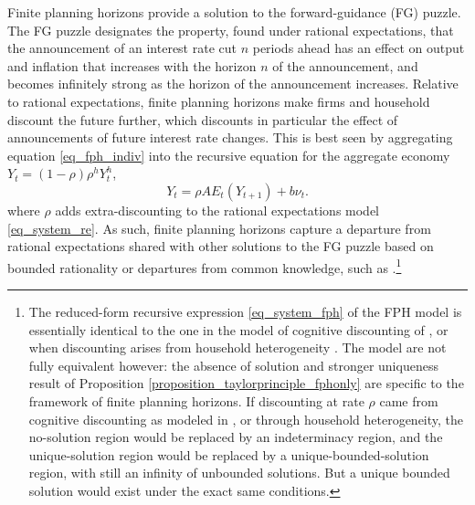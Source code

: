 \documentclass{article}
\begin{document}
Finite planning horizons provide a solution to the forward-guidance (FG) puzzle. The FG puzzle designates the property, found under rational expectations, that the announcement of an interest rate cut $n$ periods ahead has an effect on output and inflation that increases with the horizon $n$ of the announcement, and becomes infinitely strong as the horizon of the announcement increases. Relative to rational expectations, finite planning horizons make firms and household discount the future further, which discounts in particular the effect of announcements of future interest rate changes. This is best seen by aggregating equation \eqref{eq_fph_indiv} into the recursive equation for the aggregate economy $Y_t = (1-\rho) \rho^h Y_t^h$,
\begin{equation}
Y_t = \rho A E_t(Y_{t+1}) +  b \nu_t.\label{eq_system_fph}
\end{equation}
where $\rho$ adds extra-discounting to the rational expectations model \eqref{eq_system_re}. As such, finite planning horizons capture a departure from rational expectations shared with other solutions to the FG puzzle based on bounded rationality or departures from common knowledge, such as \cite{Gabaix2020,FarhiWerning2019,AngeletosLian2018}.\footnote{The reduced-form recursive expression \eqref{eq_system_fph} of the FPH model is essentially identical to the one in the model of cognitive discounting of \cite{Gabaix2020}, or when discounting arises from household heterogeneity \citep{Bilbiie2020,Werning2015}. The model are not fully equivalent however: the absence of solution and stronger uniqueness result of Proposition \ref{proposition_taylorprinciple_fphonly} are specific to the framework of finite planning horizons. If discounting at rate $\rho$ came from cognitive discounting as modeled in \cite{Gabaix2020}, or through household heterogeneity, the no-solution region would be replaced by an indeterminacy region, and the unique-solution region would be replaced by a unique-bounded-solution region, with still an infinity of unbounded solutions. But a unique bounded solution would exist under the exact same conditions.}
\end{document}
